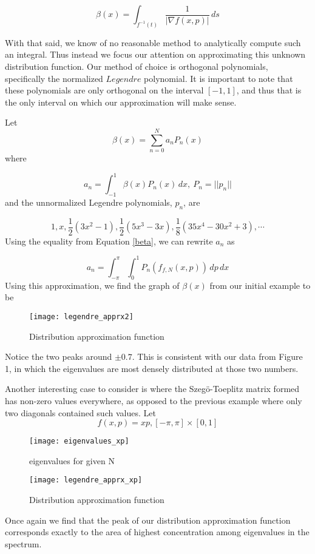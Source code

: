 \documentclass{article}
\begin{document}
\begin{equation}
\beta(x) = \int_{f^{-1}(t)} \frac{1}{\lvert\nabla f(x,p)\rvert} \,ds
\end{equation}

With that said, we know of no reasonable method to analytically compute such an integral. Thus instead we focus our attention on approximating this unknown distribution function.  Our method of choice is orthogonal polynomials, specifically the normalized $Legendre$ polynomial. It is important to note that  these polynomials are only orthogonal on the interval $[-1,1]$, and thus that is the only interval on which our approximation will  make sense.

Let 
\begin{equation} 
\beta (x) = \displaystyle\sum\limits_{n=0}^N a_n P_n(x) 
\end{equation} where 

\begin{equation} 
a_n = \int^1_{-1} \beta (x) P_n(x) \, dx,\  P_n = \lvert\lvert{p_n}\rvert\rvert 
\end{equation} and the unnormalized Legendre polynomials, $p_n$, are 

\begin{equation} 
1, x, \frac{1}{2}(3x^2 - 1), \frac{1}{2}(5x^3 -3x), \frac{1}{8}(35x^4 - 30x^2 + 3), \cdots 
\end{equation} Using the equality from Equation \ref{beta}, we can rewrite $a_n$ as 

\begin{equation} 
a_n = \int^{\pi}_{-\pi} \! \int^1_0  P_n(f_{f,N}(x,p)) \,dp \,dx
\end{equation} Using this approximation, we find the graph of $\beta (x)$ from our initial example to be 

\begin{figure} [H] 
\centerline{\texttt{[image: legendre\_apprx2]}} 
\caption{Distribution approximation function} 
\end{figure} Notice the two peaks around $\pm0.7$.  This is consistent with our data from Figure 1, in which the eigenvalues are most densely distributed at those two numbers.

Another interesting case to consider is where the Szeg\"{o}-Toeplitz matrix formed has non-zero values everywhere, as opposed to the previous example where only two diagonals contained such values.  Let $$f(x,p) = xp, [-\pi,\pi]\times[0,1]$$ \begin{figure} [H] \centerline{\texttt{[image: eigenvalues\_xp]}} \caption{eigenvalues for given N} \end{figure} \clearpage \begin{figure} [H] \centerline{\texttt{[image: legendre\_apprx\_xp]}} \caption{Distribution approximation function} \end{figure}  Once again we find that the peak of our distribution approximation function corresponds exactly to the area of highest concentration among eigenvalues in the spectrum.
\end{document}
